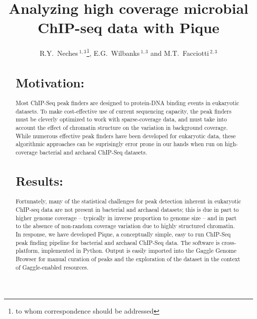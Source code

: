 \documentclass{bioinfo} %
\begin{document}

\title[In a fit of pique]{Analyzing high coverage microbial ChIP-seq
data with Pique} \author[Neches
\textit{et~al}]{R.Y.~Neches\,$^{1,3}$\footnote{to whom correspondence
should be addressed}, E.G.~Wilbanks\,$^{1,3}$ and
M.T.~Facciotti\,$^{2,3}$ \address{$^{1}$Microbiology Graduate Group,
University of California, Davis.\\ $^{2}$Department of Biomedical
Engineering, University of California, Davis.\\$^{3}$Genome Center,
University of California, Davis.}



\maketitle


\begin{abstract} \section{Motivation:}

Most ChIP-Seq peak finders are designed to protein-DNA binding events in
eukaryotic datasets. To make cost-effective use of current sequencing
capacity, the peak finders must be cleverly optimized to work with
sparse-coverage data, and must take into account the effect of chromatin
structure on the variation in background coverage. While numerous
effective peak finders have been developed for eukaryotic data, these
algorithmic approaches can be suprisingly error prone in our hands when
run on high-coverage bacterial and archaeal ChIP-Seq datasets.


\section{Results:} Fortunately, many of the statistical challenges for
peak detection inherent in eukaryotic ChIP-seq data are not present in
bacterial and archaeal datasets; this is due in part to higher genome
coverage -- typically in inverse proportion to genome size -- and in
part to the absence of non-random coverage variation due to highly
structured chromatin.  In response, we have developed Pique, a
conceptually simple, easy to run ChIP-Seq peak finding pipeline for
bacterial and archaeal ChIP-Seq data.  The software is cross-platform,
implemented in Python.  Output is easily imported into the Gaggle Genome
Browser for manual curation of peaks and the exploration of the dataset
in the context of Gaggle-enabled resources.


\end{abstract}}
\end{document}
